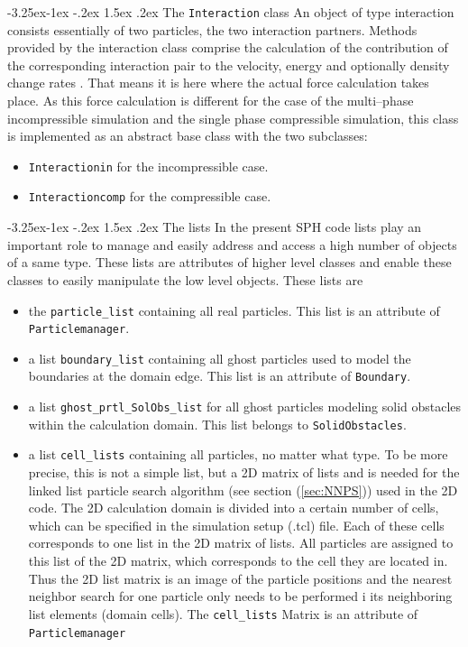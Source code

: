 \documentclass[11pt,a4paper,twoside]{report}
\makeatletter
\renewcommand\paragraph{\@startsection{paragraph}{4}{\z@}%
  {-3.25ex\@plus -1ex \@minus -.2ex}%
  {1.5ex \@plus .2ex}%
  {\normalfont\normalsize\bfseries}}
\makeatother
\begin{document}
\paragraph{The {\tt Interaction} class}
An object of type interaction consists essentially of two particles, the two interaction partners. Methods provided by the interaction class comprise the calculation of the contribution of the corresponding interaction pair to the velocity, energy and optionally density change rates . That means it is here where the actual force calculation takes place. 
As this force calculation is different for the case of the multi--phase incompressible simulation and the single phase compressible simulation, this class is implemented as an abstract base class with the two subclasses:
\begin{itemize}
 \item {\tt Interactionin} for the incompressible case.
 \item {\tt Interactioncomp} for the compressible case.
\end{itemize}


\paragraph{The lists}
In the present SPH code lists play an important role to manage and easily address and access a high number of objects of a same type. These lists are attributes of higher level classes and enable these classes to easily manipulate the low level objects. These lists are

\begin{itemize}
\item the {\tt particle\_list} containing all real particles. This list is an attribute of {\tt Particlemanager}.
\item a list {\tt boundary\_list} containing all ghost particles used to model the boundaries at the domain edge. This list is an attribute of {\tt Boundary}.
\item a list {\tt ghost\_prtl\_SolObs\_list} for all ghost particles modeling solid obstacles within the calculation domain. This list belongs to {\tt SolidObstacles}.
\item a list {\tt cell\_lists} containing all particles, no matter what type. To be more precise, this is not a simple list, but a 2D matrix of lists and is needed for the linked list particle search algorithm (see section (\ref{sec:NNPS})) used in the 2D code. The 2D calculation domain is divided into a certain number of cells, which can be specified in the simulation setup (.tcl) file. Each of these cells corresponds to one list in the 2D matrix of lists. All particles are assigned to this list of the 2D matrix, which corresponds to the cell they are located in. Thus the 2D list matrix is an image of the particle positions and the nearest neighbor search for one particle only needs to be performed i its neighboring list elements (domain cells). The {\tt cell\_lists} Matrix is an attribute of {\tt Particlemanager}
\end{itemize}
 
\end{document}
